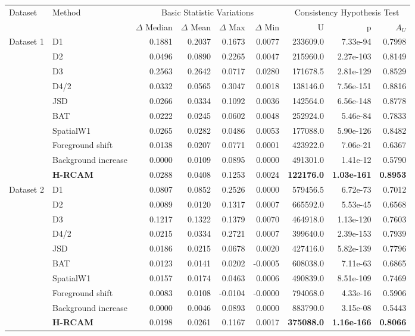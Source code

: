 \begin{tabular}{llrrrrrrr}
\toprule
Dataset & Method & \multicolumn{4}{c}{Basic Statistic Variations} & \multicolumn{3}{c}{Consistency Hypothesis Test} \\
\cmidrule(lr){3-6}\cmidrule(lr){7-9}
& & $\Delta$ Median & $\Delta$ Mean & $\Delta$ Max & $\Delta$ Min & U & p & $A_U$ \\
\midrule
\multirow{10}{*}{Dataset 1} & D1 & 0.1881 & 0.2037 & 0.1673 & 0.0077 & 233609.0 & 7.33e-94 & 0.7998 \\
 & D2 & 0.0496 & 0.0890 & 0.2265 & 0.0047 & 215960.0 & 2.27e-103 & 0.8149 \\
 & D3 & 0.2563 & 0.2642 & 0.0717 & 0.0280 & 171678.5 & 2.81e-129 & 0.8529 \\
 & D4/2 & 0.0332 & 0.0565 & 0.3047 & 0.0018 & 138146.0 & 7.56e-151 & 0.8816 \\
 & JSD & 0.0266 & 0.0334 & 0.1092 & 0.0036 & 142564.0 & 6.56e-148 & 0.8778 \\
 & BAT & 0.0222 & 0.0245 & 0.0602 & 0.0048 & 252924.0 & 5.46e-84 & 0.7833 \\
 & SpatialW1 & 0.0265 & 0.0282 & 0.0486 & 0.0053 & 177088.0 & 5.90e-126 & 0.8482 \\
 & Foreground shift & 0.0138 & 0.0207 & 0.0771 & 0.0001 & 423922.0 & 7.06e-21 & 0.6367 \\
 & Background increase & 0.0000 & 0.0109 & 0.0895 & 0.0000 & 491301.0 & 1.41e-12 & 0.5790 \\
 & \textbf{H-RCAM} & 0.0288 & 0.0408 & 0.1253 & 0.0024 & \textbf{122176.0} & \textbf{1.03e-161} & \textbf{0.8953} \\
\midrule
\multirow{10}{*}{Dataset 2} & D1 & 0.0807 & 0.0852 & 0.2526 & 0.0000 & 579456.5 & 6.72e-73 & 0.7012 \\
 & D2 & 0.0089 & 0.0120 & 0.1317 & 0.0007 & 665592.0 & 5.53e-45 & 0.6568 \\
 & D3 & 0.1217 & 0.1322 & 0.1379 & 0.0070 & 464918.0 & 1.13e-120 & 0.7603 \\
 & D4/2 & 0.0215 & 0.0334 & 0.2721 & 0.0007 & 399640.0 & 2.39e-153 & 0.7939 \\
 & JSD & 0.0186 & 0.0215 & 0.0678 & 0.0020 & 427416.0 & 5.82e-139 & 0.7796 \\
 & BAT & 0.0123 & 0.0141 & 0.0202 & -0.0005 & 608038.0 & 7.11e-63 & 0.6865 \\
 & SpatialW1 & 0.0157 & 0.0174 & 0.0463 & 0.0006 & 490839.0 & 8.51e-109 & 0.7469 \\
 & Foreground shift & 0.0083 & 0.0108 & -0.0104 & -0.0000 & 794068.0 & 4.33e-16 & 0.5906 \\
 & Background increase & 0.0000 & 0.0046 & 0.0893 & 0.0000 & 883790.0 & 3.15e-08 & 0.5443 \\
 & \textbf{H-RCAM} & 0.0198 & 0.0261 & 0.1167 & 0.0017 & \textbf{375088.0} & \textbf{1.16e-166} & \textbf{0.8066} \\
\bottomrule
\end{tabular}
